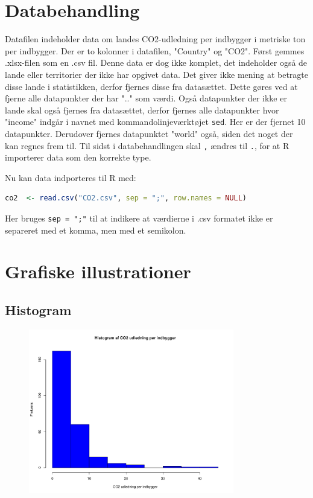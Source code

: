 \documentclass{article}
\author{Peter Heilbo Ratgen - perat17@student.sdu.dk}
\date{ \today}
\begin{document}
 
\maketitle 
\newpage 
\section{Databehandling}
Datafilen indeholder data om landes CO2-udledning per indbygger i metriske ton
per indbygger. Der er to kolonner i datafilen, "Country" og "CO2". Først gemmes
.xlsx-filen som en .csv fil. Denne data er dog ikke komplet, det indeholder også
de lande eller territorier der ikke har opgivet data. Det giver ikke mening at
betragte disse lande i statistikken, derfor fjernes disse fra datasættet. Dette
gøres ved at fjerne alle datapunkter der har ".." som værdi.  Også datapunkter
der ikke er lande skal også fjernes fra datasættet, derfor fjernes alle
datapunkter hvor "income" indgår i navnet med kommandolinjeværktøjet
\texttt{sed}. Her er der fjernet 10 datapunkter. Derudover fjernes datapunktet
"world" også, siden det noget der kan regnes frem til. Til sidst i
databehandlingen skal \lstinline|,| ændres til \lstinline|.|, for at R
importerer data som den korrekte type.

Nu kan data indporteres til R med:
\begin{lstlisting}[language=R]
co2  <- read.csv("CO2.csv", sep = ";", row.names = NULL)
\end{lstlisting}
Her bruges \lstinline|sep = ";"| til at indikere at værdierne i .csv formatet
ikke er separeret med et komma, men med et semikolon.

\section{Grafiske illustrationer}

\subsection{Histogram}

\begin{figure}[H]
  \centering
  \includegraphics[width=0.8\textwidth]{co2plot.pdf}
\end{figure}
\end{document}

